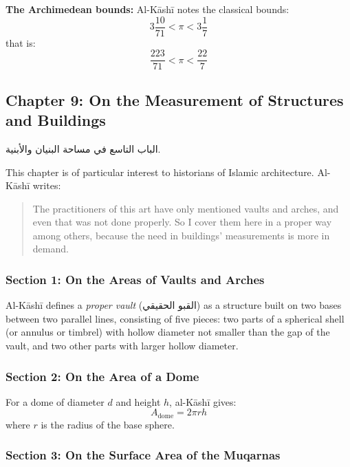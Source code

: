 \documentclass[11pt,a4paper]{article}
\newenvironment{arabicbox}{%
  \begin{framed}
  \begin{minipage}{\linewidth-2\fboxsep-2\fboxrule}
  \setlength{\parindent}{0pt}
  \linespread{1.3}\selectfont
}{%
  \end{minipage}
  \end{framed}
}
\newcommand{\ar}[1]{{\arabicfont\beginR #1\endR}}
\begin{document}
\noindent\textbf{The Archimedean bounds:} Al-K\=ash\=i notes the classical
bounds:
\[
3\frac{10}{71} < \pi < 3\frac{1}{7}
\]
that is:
\[
\frac{223}{71} < \pi < \frac{22}{7}
\]

\subsection{Chapter 9: On the Measurement of Structures and Buildings}

\begin{arabicbox}
\begin{Arabic}
الباب التاسع في مساحة البنيان والأبنية.
\end{Arabic}
\end{arabicbox}

\vspace{0.3cm}

This chapter is of particular interest to historians of Islamic
architecture. Al-K\=ash\=i writes:

\begin{quote}
The practitioners of this art have only mentioned vaults and arches,
and even that was not done properly. So I cover them here in a proper
way among others, because the need in buildings' measurements is more in
demand.
\end{quote}

\subsubsection{Section 1: On the Areas of Vaults and Arches}

Al-K\=ash\=i defines a \textit{proper vault} (\ar{القبو الحقيقي}) as a
structure built on two bases between two parallel lines, consisting of
five pieces: two parts of a spherical shell (or annulus or timbrel) with
hollow diameter not smaller than the gap of the vault, and two other
parts with larger hollow diameter.

\subsubsection{Section 2: On the Area of a Dome}

For a dome of diameter $d$ and height $h$, al-K\=ash\=i gives:
\[
A_{\text{dome}} = 2\pi r h
\]
where $r$ is the radius of the base sphere.

\subsubsection{Section 3: On the Surface Area of the Muqarnas}
\end{document}
